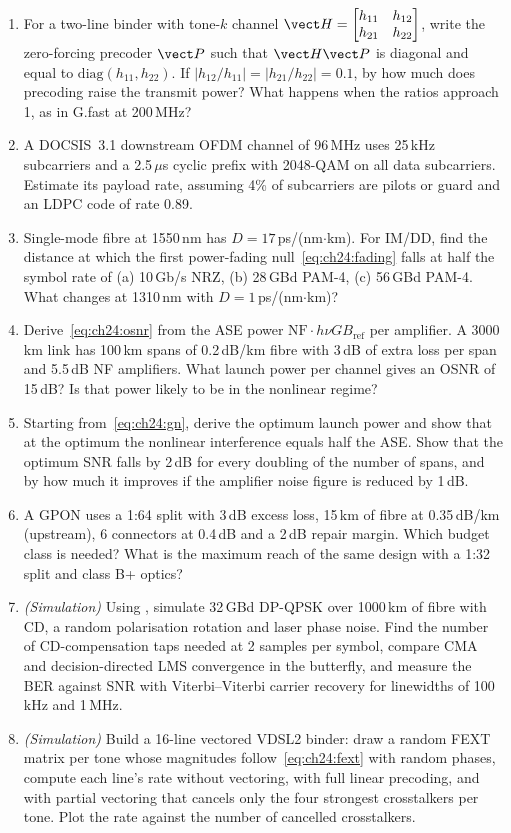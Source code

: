 \begin{enumerate}[label=\thechapter.\arabic*]
approximate downstream rate on a 2.5\,km loop. Compare with Figure~\ref{fig:ch24_dsl_rate_reach}.
\item For a two-line binder with tone-$k$ channel $\vect H=\begin{bmatrix}h_{11}&h_{12}\\h_{21}&h_{22}\end{bmatrix}$,
write the zero-forcing precoder $\vect P$ such that $\vect H\vect P$ is diagonal and equal to
$\mathrm{diag}(h_{11},h_{22})$. If $|h_{12}/h_{11}|=|h_{21}/h_{22}|=0.1$, by how much does precoding raise
the transmit power? What happens when the ratios approach 1, as in G.fast at 200\,MHz?
\item A DOCSIS~3.1 downstream OFDM channel of 96\,MHz uses 25\,kHz subcarriers and a 2.5\,$\mu$s cyclic prefix
with 2048-QAM on all data subcarriers. Estimate its payload rate, assuming 4\% of subcarriers are pilots or
guard and an LDPC code of rate 0.89.
\item Single-mode fibre at 1550\,nm has $D=17$\,ps/(nm$\cdot$km). For IM/DD, find the distance at which the
first power-fading null~\eqref{eq:ch24:fading} falls at half the symbol rate of (a) 10\,Gb/s NRZ, (b)
28\,GBd PAM-4, (c) 56\,GBd PAM-4. What changes at 1310\,nm with $D=1$\,ps/(nm$\cdot$km)?
\item Derive~\eqref{eq:ch24:osnr} from the ASE power $\mathrm{NF}\cdot h\nu G B_{\mathrm{ref}}$ per amplifier.
A 3000\,km link has 100\,km spans of 0.2\,dB/km fibre with 3\,dB of extra loss per span and 5.5\,dB NF
amplifiers. What launch power per channel gives an OSNR of 15\,dB? Is that power likely to be in the
nonlinear regime?
\item Starting from~\eqref{eq:ch24:gn}, derive the optimum launch power and show that at the optimum the
nonlinear interference equals half the ASE. Show that the optimum SNR falls by 2\,dB for every doubling of
the number of spans, and by how much it improves if the amplifier noise figure is reduced by 1\,dB.
\item A GPON uses a 1:64 split with 3\,dB excess loss, 15\,km of fibre at 0.35\,dB/km (upstream), 6
connectors at 0.4\,dB and a 2\,dB repair margin. Which budget class is needed? What is the maximum reach of
the same design with a 1:32 split and class B+ optics?
\item \emph{(Simulation)} Using , simulate 32\,GBd DP-QPSK over 1000\,km of fibre
with CD, a random polarisation rotation and laser phase noise. Find the number of CD-compensation taps
needed at 2 samples per symbol, compare CMA and decision-directed LMS convergence in the butterfly, and
measure the BER against SNR with Viterbi--Viterbi carrier recovery for linewidths of 100\,kHz and 1\,MHz.
\item \emph{(Simulation)} Build a 16-line vectored VDSL2 binder: draw a random FEXT matrix per tone whose
magnitudes follow~\eqref{eq:ch24:fext} with random phases, compute each line's rate without vectoring, with
full linear precoding, and with partial vectoring that cancels only the four strongest crosstalkers per tone.
Plot the rate against the number of cancelled crosstalkers.
\end{enumerate}

